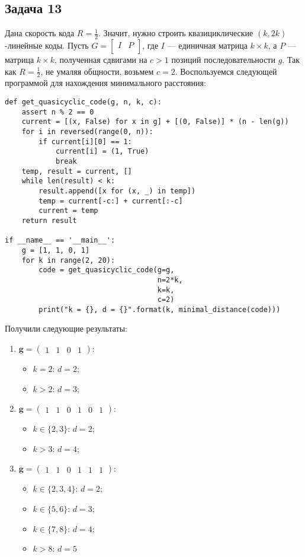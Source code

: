 \documentclass{article}
\begin{document}
\subsection{Задача 13}
Дана скорость кода $R = \frac{1}{2}$. Значит, нужно строить квазициклические $(k, 2k)$-линейные коды. Пусть
$G = 
\begin{bmatrix}
I & P \\
\end{bmatrix}$,
где $I$ {---} единичная матрица $k \times k$, а $P$ {---} матрица $k \times k$, полученная сдвигами на $c > 1$ позиций последовательности $g$.
Так как $R=\frac{1}{2}$, не умаляя общности, возьмем $c=2$. Воспользуемся следующей программой для нахождения минимального расстояния:
\begin{lstlisting}[frame=single]
def get_quasicyclic_code(g, n, k, c):
    assert n % 2 == 0
    current = [(x, False) for x in g] + [(0, False)] * (n - len(g))
    for i in reversed(range(0, n)):
        if current[i][0] == 1:
            current[i] = (1, True)
            break
    temp, result = current, []
    while len(result) < k:
        result.append([x for (x, _) in temp])
        temp = current[-c:] + current[:-c]
        current = temp
    return result

if __name__ == '__main__':
    g = [1, 1, 0, 1]
    for k in range(2, 20):
        code = get_quasicyclic_code(g=g,
                                    n=2*k,
                                    k=k,
                                    c=2)
        print("k = {}, d = {}".format(k, minimal_distance(code)))
\end{lstlisting}
Получили следующие результаты:
\begin{enumerate}
     \item $\boldsymbol{g} = \begin{pmatrix}1 & 1 & 0 & 1\end{pmatrix}$:
     \begin{itemize}
         \item $k=2$: $d=2$;
         \item $k > 2$: $d=3$;
     \end{itemize}
     \item $\boldsymbol{g} = \begin{pmatrix}1 & 1 & 0 & 1 & 0 & 1\end{pmatrix}$:
     \begin{itemize}
         \item $k \in \{2, 3\}$: $d=2$;
         \item $k > 3$: $d=4$;
     \end{itemize}
     \item $\boldsymbol{g} = \begin{pmatrix}1 & 1 & 0 & 1 & 1 & 1\end{pmatrix}$:
     \begin{itemize}
         \item $k \in \{2,3,4\}$: $d=2$;
         \item $k \in \{5, 6\}$: $d=3$;
         \item $k\in \{7,8\}$: $d=4$;
         \item $k > 8$: $d=5$
     \end{itemize}
\end{enumerate}
\end{document}
